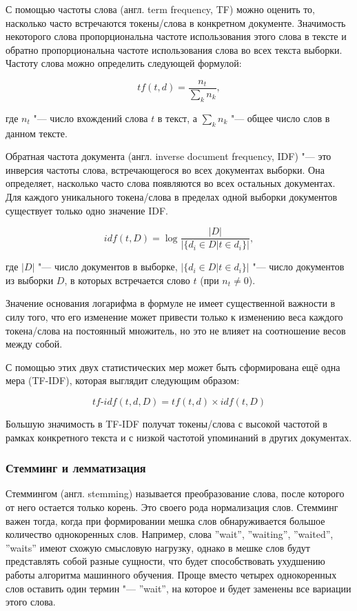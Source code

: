 \documentclass[bachelor, och, coursework]{SCWorks}
\begin{document}
            С помощью частоты слова (англ. term frequency, TF) можно оценить то,
            насколько часто встречаются токены/слова в конкретном документе.
            Значимость некоторого слова пропорциональна частоте использования
            этого слова в тексте и обратно пропорциональна частоте использования
            слова во всех текста выборки. Частоту слова можно определить
            следующей формулой:

            $$tf(t, d) = \frac{n_t}{\sum_k n_k},$$

            где $n_t$ "--- число вхождений слова $t$ в текст, а $\sum_k n_k$
            "--- общее число слов в данном тексте.

            Обратная частота документа (англ. inverse document frequency, IDF)
            "--- это инверсия частоты слова, встречающегося во всех документах
            выборки. Она определяет, насколько часто слова появляются во всех
            остальных документах. Для каждого уникального токена/слова в
            пределах одной выборки документов существует только одно значение
            IDF.

            $$idf(t, D) = \log \frac{|D|}{|\{d_i \in D | t \in d_i \}|},$$

            где $|D|$ "--- число документов в выборке, $|\{d_i \in D | t \in d_i
            \}|$ "--- число документов из выборки $D$, в которых встречается
            слово $t$ (при $n_t \neq 0$).

            Значение основания логарифма в формуле не имеет существенной
            важности в силу того, что его изменение может привести только к
            изменению веса каждого токена/слова на постоянный множитель, но это
            не влияет на соотношение весов между собой.

            С помощью этих двух статистических мер может быть сформирована ещё
            одна мера (TF-IDF), которая выглядит следующим образом:

            $$tf \text{-} idf(t, d, D) = tf(t,d) \times idf(t, D)$$

            Большую значимость в TF-IDF получат токены/слова с высокой частотой
            в рамках конкретного текста и с низкой частотой упоминаний в других
            документах.

        \subsubsection{Стемминг и лемматизация}
            Стеммингом (англ. stemming) называется преобразование слова, после
            которого от него остается только корень. Это своего рода
            нормализация слов. Стемминг важен тогда, когда при формировании
            мешка слов обнаруживается большое количество однокоренных слов.
            Например, слова ''wait'', ''waiting'', ''waited'', ''waits'' имеют
            схожую смысловую нагрузку, однако в мешке слов будут представлять
            собой разные сущности, что будет способствовать ухудшению работы
            алгоритма машинного обучения. Проще вместо четырех однокоренных слов
            оставить один термин "--- ''wait'', на которое и будет заменены все
            вариации этого слова.
\end{document}
